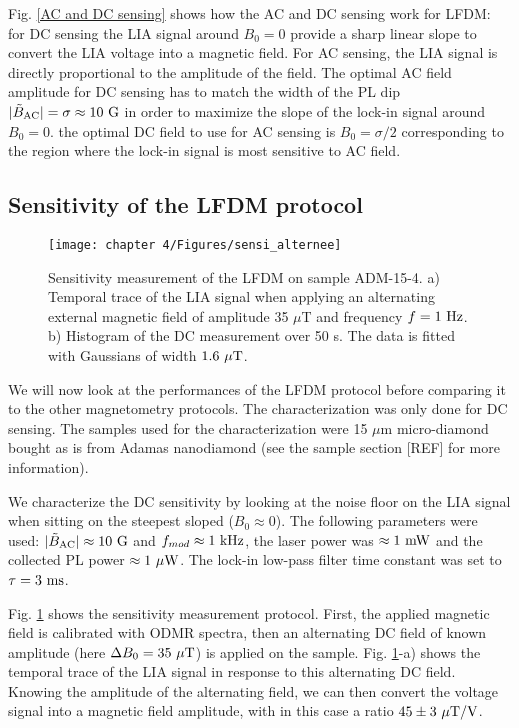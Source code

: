 \documentclass[a4paper, 11pt]{book}
\begin{document}
Fig. \ref{AC and DC sensing} shows how the AC and DC sensing work for LFDM: for DC sensing the LIA signal around $B_0=0$ provide a sharp linear slope to convert the LIA voltage into a magnetic field. For AC sensing, the LIA signal is directly proportional to the amplitude of the field. The optimal AC field amplitude for DC sensing has to match the width of the PL dip $|\tilde{B}_{\rm AC}| = \sigma \approx 10\ \rm G$ in order to maximize the slope of the lock-in signal around $B_0=0$. the optimal DC field to use for AC sensing is $B_0= \sigma/2$ corresponding to the region where the lock-in signal is most sensitive to AC field. 

\subsection{Sensitivity of the LFDM protocol}
\begin{figure}[h!]
\centering
\texttt{[image: chapter 4/Figures/sensi\_alternee]}
\caption{Sensitivity measurement of the LFDM on sample ADM-15-4. a) Temporal trace of the LIA signal when applying an alternating external magnetic field of amplitude 35 $\mu$T and frequency $f=1\ \rm Hz$. b) Histogram of the DC measurement over 50 s. The data is fitted with Gaussians of width $1.6\ \rm{\mu T}$.}
\label{sensei alternee}
\end{figure}

We will now look at the performances of the LFDM protocol before comparing it to the other magnetometry protocols. The characterization was only done for DC sensing. The samples used for the characterization were 15 $\mu$m micro-diamond bought as is from Adamas nanodiamond (see the sample section [REF] for more information).

We characterize the DC sensitivity by looking at the noise floor on the LIA signal when sitting on the steepest sloped ($B_0\approx 0$). The following parameters were used: $|\tilde{B}_{\rm AC}|\approx 10\ \rm G$ and $f_{mod} \approx 1\ \rm kHz$, the laser power was $\approx 1\ \rm mW$ and the collected PL power $\approx 1\ \rm{\mu W}$. The lock-in low-pass filter time constant was set to $\tau=3\ \rm ms$.

Fig. \ref{sensei alternee} shows the sensitivity measurement protocol. First, the applied magnetic field is calibrated with ODMR spectra, then an alternating DC field of known amplitude (here $\Delta B_0=35\ \rm{\mu T}$) is applied on the sample. Fig. \ref{sensei alternee}-a) shows the temporal trace of the LIA signal in response to this alternating DC field. Knowing the amplitude of the alternating field, we can then convert the voltage signal into a magnetic field amplitude, with in this case a ratio $45 \pm 3\ \rm{\mu T /V}$.
\end{document}
